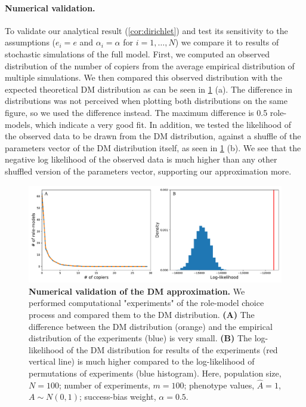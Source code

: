 \documentclass[12pt]{extarticle}
\begin{document}
\paragraph{Numerical validation.}
To validate our analytical result (\cref{cor:dirichlet}) and test its sensitivity to the assumptions ($e_i=e$ and $\alpha_i=\alpha$ for $i=1,\ldots,N$) we compare it to results of stochastic simulations of the full model.
First, we computed an observed distribution of the number of copiers from the average empirical distribution of multiple simulations.
We then compared this observed distribution with the expected theoretical DM distribution as can be seen in \cref{fig:DM_validation} (a). The difference in distributions was not perceived when plotting both distributions on the same figure, so we used the difference instead. The maximum difference is 0.5 role-models, which indicate a very good fit.
In addition, we tested the likelihood of the observed data to be drawn from the DM distribution, against a shuffle of the parameters vector of the DM distribution itself, as seen in \cref{fig:DM_validation} (b). We see that the negative log likelihood of the observed data is much higher than any other shuffled version of the parameters vector, supporting our approximation more.


\begin{figure}[h]
    \includegraphics[width=\linewidth]{../figures/final/DM_validation.pdf}
  \caption{
  \textbf{Numerical validation of the DM approximation.}
  We performed computational "experiments" of the role-model choice process and compared them to the DM distribution. 
  \textbf{(A)} The difference between the DM distribution (orange) and the empirical distribution of the experiments (blue) is very small. 
  \textbf{(B)} The log-likelihood of the DM distribution for results of the experiments (red vertical line) is much higher compared to the log-likelihood of permutations of experiments (blue histogram).
  Here, population size, $N=100$; number of experiments, $m=100$; phenotype values, $\hat{A}=1$, $A \sim N(0,1)$; success-bias weight, $\alpha=0.5$.}	
  \label{fig:DM_validation}
\end{figure}
\end{document}
